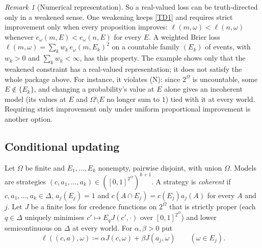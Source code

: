 \documentclass[11pt]{article}
\newenvironment{chgblockb}{\color{violet}}{}
\theoremstyle{definition}
\theoremstyle{remark}
\newtheorem{remark}[theorem]{Remark}
\begin{document}
\begin{chgblockb}
\begin{remark}[Numerical representation]
So a real-valued loss can be truth-directed only in a weakened sense. One weakening keeps \ref{TD1} and requires strict improvement only when every proposition improves: $\ell(m,\omega)<\ell(n,\omega)$ whenever $e_\omega(m,E)<e_\omega(n,E)$ for every $E$. A weighted Brier loss $\ell(m,\omega)=\sum_kw_k\,e_\omega(m,E_k)^2$ on a countable family $(E_k)$ of events, with $w_k>0$ and $\sum_kw_k<\infty$, has this property. The example shows only that the weakened constraint has a real-valued representation; it does not satisfy the whole package above. For instance, it violates (N): since $2^\Omega$ is uncountable, some $E\notin\{E_k\}$, and changing a probability's value at $E$ alone gives an incoherent model (its values at $E$ and $\Omega\setminus E$ no longer sum to $1$) tied with it at every world. Requiring strict improvement only under uniform proportional improvement is another option.
\end{remark}
\end{chgblockb}

\subsection{Conditional updating}

Let $\Omega$ be finite and $E_1,\dots,E_k$ nonempty, pairwise disjoint, with union $\Omega$. Models are strategies $(c,a_1,\dots,a_k)\in([0,1]^{2^\Omega})^{k+1}$. A strategy is \emph{coherent} if $c,a_1,\dots,a_k\in\Delta$, $a_j(E_j)=1$ and $c(A\cap E_j)=c(E_j)a_j(A)$ for every $A$ and $j$. Let $J$ be a finite loss for credence functions on $2^\Omega$ that is strictly proper (each $q\in\Delta$ uniquely minimises $c'\mapsto E_qJ(c',\cdot)$ over $[0,1]^{2^\Omega}$) and lower semicontinuous on $\Delta$ at every world. For $\alpha,\beta>0$ put
\[
\ell((c,a),\omega)\coloneqq\alpha J(c,\omega)+\beta J(a_j,\omega)\qquad(\omega\in E_j).
\]
\end{document}
